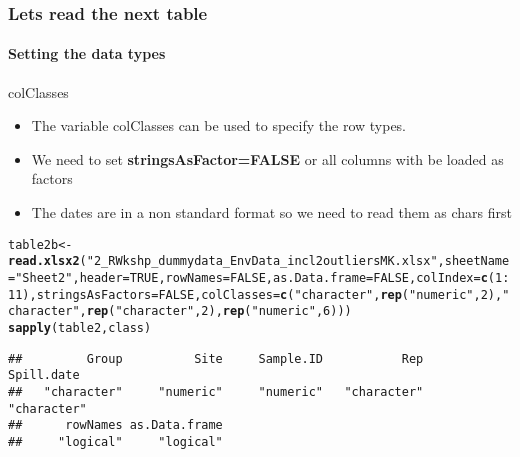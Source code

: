 \documentclass[12pt]{beamer}\usepackage[]{graphicx}\usepackage[]{color}
\makeatletter
\newcommand{\hlnum}[1]{\textcolor[rgb]{0.686,0.059,0.569}{#1}}%
\newcommand{\hlstr}[1]{\textcolor[rgb]{0.192,0.494,0.8}{#1}}%
\newcommand{\hlopt}[1]{\textcolor[rgb]{0,0,0}{#1}}%
\newcommand{\hlstd}[1]{\textcolor[rgb]{0.345,0.345,0.345}{#1}}%
\newcommand{\hlkwb}[1]{\textcolor[rgb]{0.69,0.353,0.396}{#1}}%
\newcommand{\hlkwc}[1]{\textcolor[rgb]{0.333,0.667,0.333}{#1}}%
\newcommand{\hlkwd}[1]{\textcolor[rgb]{0.737,0.353,0.396}{\textbf{#1}}}%
\newenvironment{kframe}{%
 \def\at@end@of@kframe{}%
 \ifinner\ifhmode%
  \def\at@end@of@kframe{\end{minipage}}%
  \begin{minipage}{\columnwidth}%
 \fi\fi%
 \def\FrameCommand##1{\hskip\@totalleftmargin \hskip-\fboxsep
 \colorbox{shadecolor}{##1}\hskip-\fboxsep
     \hskip-\linewidth \hskip-\@totalleftmargin \hskip\columnwidth}%
 \MakeFramed {\advance\hsize-\width
   \@totalleftmargin\z@ \linewidth\hsize
   \@setminipage}}%
 {\par\unskip\endMakeFramed%
 \at@end@of@kframe}
\newenvironment{knitrout}{}{} %
\makeatother
\begin{document}
\begin{frame}[fragile]
  \frametitle{Lets read the next table}
  \framesubtitle{Setting the data types}
\begin{block}{colClasses}
\begin{itemize}
\item The variable colClasses can be used to specify the row types.
\item We need to set {\bf stringsAsFactor=FALSE} or all columns with be loaded as factors
\item The dates are in a non standard format so we need to read them as chars first
\end{itemize}
\end{block}

\begin{knitrout}
\color{fgcolor}\begin{kframe}
\begin{alltt}
\hlstd{table2b}\hlkwb{<-}\hlkwd{read.xlsx2}\hlstd{(}\hlstr{"2_R Wkshp_dummy data_Env Data_incl2outliersMK.xlsx"}\hlstd{,} \hlkwc{sheetName} \hlstd{=} \hlstr{"Sheet2"}\hlstd{,}\hlkwc{header}\hlstd{=}\hlnum{TRUE}\hlstd{,}\hlkwc{rowNames}\hlstd{=}\hlnum{FALSE}\hlstd{,}\hlkwc{as.Data.frame}\hlstd{=}\hlnum{FALSE}\hlstd{,}\hlkwc{colIndex}\hlstd{=}\hlkwd{c}\hlstd{(}\hlnum{1}\hlopt{:}\hlnum{11}\hlstd{),}\hlkwc{stringsAsFactors}\hlstd{=}\hlnum{FALSE}\hlstd{,}\hlkwc{colClasses}\hlstd{=}\hlkwd{c}\hlstd{(}\hlstr{"character"}\hlstd{,}\hlkwd{rep}\hlstd{(}\hlstr{"numeric"}\hlstd{,}\hlnum{2}\hlstd{),}\hlstr{"character"}\hlstd{,}\hlkwd{rep}\hlstd{(}\hlstr{"character"}\hlstd{,}\hlnum{2}\hlstd{),}\hlkwd{rep}\hlstd{(}\hlstr{"numeric"}\hlstd{,}\hlnum{6}\hlstd{)))}
\hlkwd{sapply}\hlstd{(table2,class)}
\end{alltt}
\begin{verbatim}
##         Group          Site     Sample.ID           Rep    Spill.date 
##   "character"     "numeric"     "numeric"   "character"   "character" 
##      rowNames as.Data.frame 
##     "logical"     "logical"
\end{verbatim}
\end{kframe}
\end{knitrout}
\clearpage
\end{frame}
\end{document}
